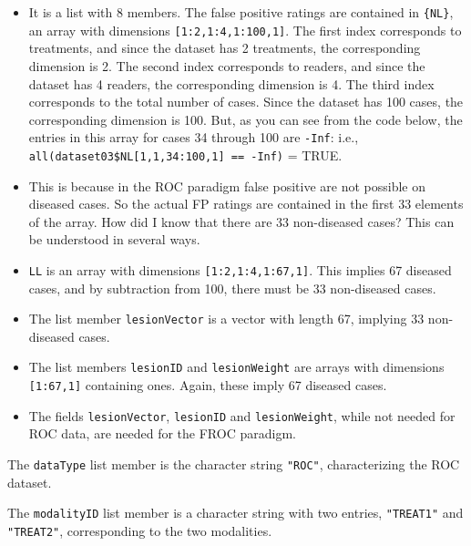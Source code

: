 \documentclass[
]{book}
\newenvironment{Shaded}{\begin{snugshade}}{\end{snugshade}}
\newcommand{\CommentTok}[1]{\textcolor[rgb]{0.56,0.35,0.01}{\textit{#1}}}
\newcommand{\NormalTok}[1]{#1}
\newcommand{\OperatorTok}[1]{\textcolor[rgb]{0.81,0.36,0.00}{\textbf{#1}}}
\begin{document}
\begin{itemize}
\item
  It is a list with 8 members. The false positive ratings are contained in \texttt{\{NL\}}, an array
  with dimensions \texttt{{[}1:2,1:4,1:100,1{]}}. The first index corresponds to treatments, and since the
  dataset has 2 treatments, the corresponding dimension is 2. The second index corresponds to
  readers, and since the dataset has 4 readers, the corresponding dimension is 4. The third index
  corresponds to the total number of cases. Since the dataset has 100 cases, the corresponding
  dimension is 100. But, as you can see from the code below, the entries in this array for cases 34
  through 100 are \texttt{-Inf}: i.e., \texttt{all(dataset03\$NL{[}1,1,34:100,1{]}\ ==\ -Inf)} = TRUE.
\item
  This is because in the ROC paradigm false positive are not possible on diseased cases. So the actual FP ratings are contained in the first 33 elements of the array. How did I know that there are 33 non-diseased cases? This can be understood in several ways.
\item
  \texttt{LL} is an array with dimensions \texttt{{[}1:2,1:4,1:67,1{]}}. This implies 67 diseased cases, and by subtraction from 100, there must be 33 non-diseased cases.
\item
  The list member \texttt{lesionVector} is a vector with length 67, implying 33 non-diseased cases.
\item
  The list members \texttt{lesionID} and \texttt{lesionWeight} are arrays with dimensions \texttt{{[}1:67,1{]}} containing ones. Again, these imply 67 diseased cases.
\item
  The fields \texttt{lesionVector}, \texttt{lesionID} and \texttt{lesionWeight}, while not needed for ROC data, are needed for the FROC paradigm.
\end{itemize}

The \texttt{dataType} list member is the character string \texttt{"ROC"}, characterizing the ROC dataset.

\begin{Shaded}
\end{Shaded}

The \texttt{modalityID} list member is a character string with two entries, \texttt{"TREAT1"} and \texttt{"TREAT2"}, corresponding to the two modalities.
\end{document}
